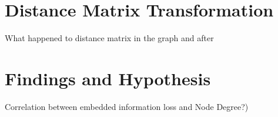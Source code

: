 \section{Distance Matrix Transformation}
What happened to distance matrix in the graph and after
%

% 

\section{Findings and Hypothesis}
Correlation between embedded information loss and Node Degree?)

